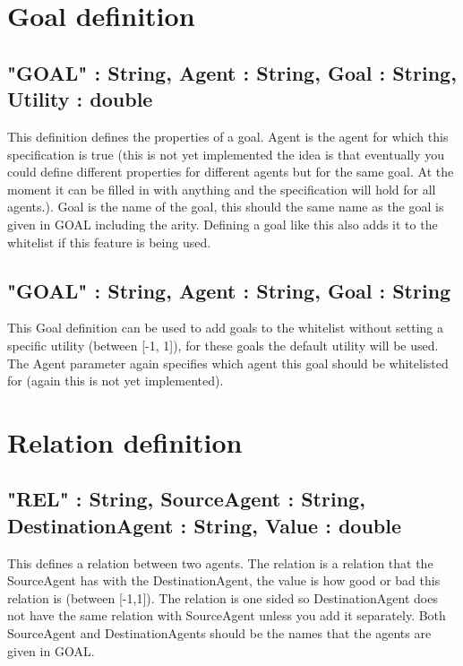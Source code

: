 \documentclass{scrartcl}
\begin{document}
\section*{Goal definition}
\subsection*{"GOAL" : String, Agent : String, Goal : String, Utility : double}
This definition defines the properties of a goal. Agent is the agent for which this specification is true (this is not yet implemented the idea is that eventually you could define different properties for different agents but for the same goal. At the moment it can be filled in with anything and the specification will hold for all agents.). Goal is the name of the goal, this should the same name as the goal is given in GOAL including the arity. Defining a goal like this also adds it to the whitelist if this feature is being used.
\subsection*{"GOAL" : String, Agent : String, Goal : String}
This Goal definition can be used to add goals to the whitelist without setting a specific utility (between [-1, 1]), for these goals the default utility will be used. The Agent parameter again specifies which agent this goal should be whitelisted for (again this is not yet implemented).

\section*{Relation definition}
\subsection*{"REL" : String, SourceAgent : String, DestinationAgent : String, Value : double}
This defines a relation between two agents. The relation is a relation that the SourceAgent has with the DestinationAgent, the value is how good or bad this relation is (between [-1,1]). The relation is one sided so DestinationAgent does not have the same relation with SourceAgent unless you add it separately. Both SourceAgent and DestinationAgents should be the names that the agents are given in GOAL.
\end{document}
